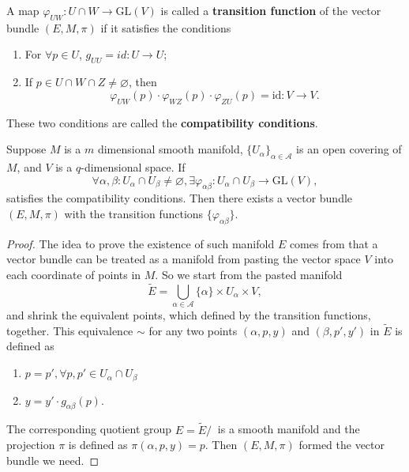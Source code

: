 \begin{definition}
A map $\varphi_{UW}:U\cap W\to \text{GL}(V)$ is called a \textbf{transition function} of the vector bundle $(E,M,\pi)$ if it satisfies the conditions
\begin{enumerate}
\item For $\forall p\in U$, $g_{UU}=id:U\to U$;
\item If $p\in U\cap W\cap Z\ne\varnothing$, then
\begin{equation}
\varphi_{UW}(p)\cdot\varphi_{WZ}(p)\cdot\varphi_{ZU}(p)=\text{id}:V\to V.
\end{equation}
\end{enumerate}
These two conditions are called the \textbf{compatibility conditions}.
\end{definition}

\begin{theorem}
Suppose $M$ is a $m$ dimensional smooth manifold, $\{U_\alpha\}_{\alpha\in\mathcal{A}}$ is an open covering of $M$, and $V$ is a $q$-dimensional space. If 
\begin{equation*}
\forall \alpha,\beta: U_\alpha\cap U_\beta\ne\varnothing, \exists \varphi_{\alpha\beta}:U_\alpha\cap U_\beta\to \text{GL}(V),
\end{equation*}
satisfies the compatibility conditions. Then there exists a vector bundle $(E,M,\pi)$ with the transition functions $\{\varphi_{\alpha\beta}\}$.
\end{theorem}

\begin{proof}
The idea to prove the existence of such manifold $E$ comes from that a vector bundle can be treated as a manifold from pasting the vector space $V$ into each coordinate of points in $M$. So we start from the pasted manifold 
\begin{equation*}
\tilde{E}=\bigcup_{\alpha\in\mathcal{A}}\{\alpha\}\times U_\alpha\times V,
\end{equation*} 
and shrink the equivalent points, which defined by the transition functions, together. This equivalence $\sim$ for any two points $(\alpha,p,y)$ and $(\beta,p',y')$ in $\tilde E$ is defined as
\begin{enumerate}
\item $p=p',\forall p,p'\in U_\alpha\cap U_\beta$
\item $y=y'\cdot g_{\alpha\beta}(p)$.
\end{enumerate}
The corresponding quotient group $E=\tilde E/~$ is a smooth manifold and the projection $\pi$ is defined as $\pi(\alpha,p,y)=p$. Then $(E,M,\pi)$ formed the vector bundle we need.
\end{proof}

